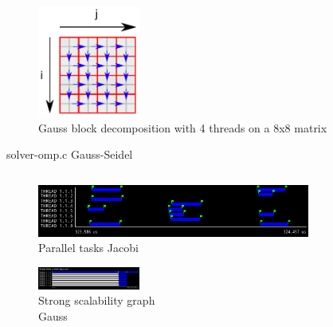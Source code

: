 



\begin{figure}[H]
    \centering
    \includegraphics[width=0.3\textwidth]{gauss_blocks}
    \caption{Gauss block decomposition with 4 threads on a 8x8 matrix}%
    \label{fig:blocks-gauss}
\end{figure}

\begin{listing}[H]
    \caption{solver-omp.c Gauss-Seidel}%
    \label{lst:gauss}
    \inputminted[firstline=57,lastline=89]{c}{code/solver-omp.c}
\end{listing}


\begin{figure}[H]
    \centering
    \includegraphics[width=0.8\textwidth]{jacobi_0_tasks}
    \caption{Parallel tasks Jacobi}%
    \label{fig:trace-jacobi0}
\end{figure}

\begin{figure}[H]
    \centering
    \includegraphics[width=0.3\textwidth]{figures/thread_state_heat_omp_8.png}
    \caption{Strong scalability graph \\ Gauss}%
    \label{fig:strong-gauss}
\end{figure}

